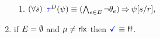 \begin{definition}
\begin{enumerate}[topsep=0pt,label=(\textsc{r}\arabic*),ref=\textsc{r}\arabic*]
\begin{enumerate}[leftmargin=0pt]
    \item \label{read-tau-empty-ca}
      \begin{math}
        (\forall s)
      \end{math}
      \begin{math}
        \aTr{\bEvs}{\bForm} \riff 
        (\bigwedge_{\aEv\in\aEvs}\lnot\cForm_\aEv)
        \limplies 
        \bForm[\bReg/\aReg],
      \end{math}  
    \end{enumerate}  
  \item \label{read-term-ca}
    if $E=\emptyset$ and $\mu\neq{\mathsf{rlx}}$ then $\aTerm \riff \FALSE$. 
  \end{enumerate}
\end{definition}



